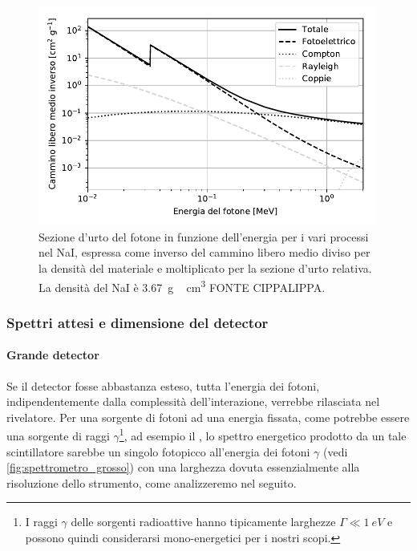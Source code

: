   \begin{figure}[h]
 	\centering
 	\includegraphics[width=30em]{cross}
 	\caption{\label{fig:photon_cross_section_xcom}
	Sezione d'urto del fotone in funzione dell'energia per i vari processi nel NaI,
	espressa come inverso del cammino libero medio diviso per la densità del materiale
	e moltiplicato per la sezione d'urto relativa.
	La densità del NaI è \SI{3.67}{g\,cm^3} FONTE CIPPALIPPA.}
 \end{figure}
 
 \subsubsection{Spettri attesi e dimensione del detector}
 \paragraph{Grande detector} Se il detector fosse abbastanza esteso, tutta l'energia dei fotoni, indipendentemente dalla complessità dell'interazione, verrebbe rilasciata nel rivelatore. Per una sorgente di fotoni ad una energia fissata, come potrebbe essere una sorgente di raggi $\gamma$\footnote{I raggi $\gamma$ delle sorgenti radioattive hanno tipicamente larghezze $\Gamma \ll \SI{1}{eV}$ e possono quindi considerarsi mono-energetici per i nostri scopi.},
 ad esempio il \cs, lo spettro energetico prodotto da un tale scintillatore sarebbe un singolo fotopicco all'energia dei fotoni $\gamma$ (vedi \autoref{fig:spettrometro_grosso}) con una larghezza dovuta essenzialmente alla risoluzione dello strumento, come analizzeremo nel seguito.
 

